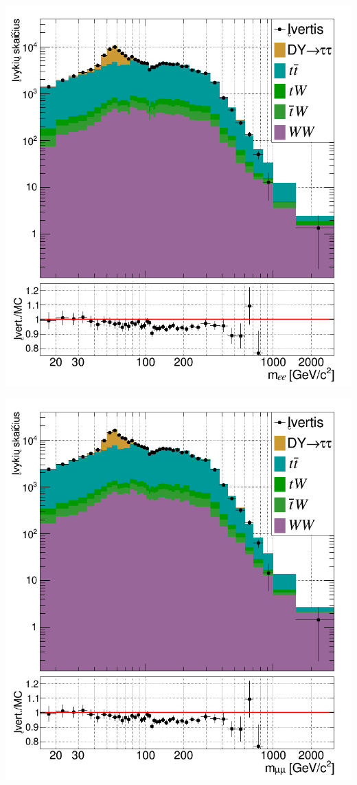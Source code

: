 \documentclass[a4paper, 12pt]{article}
\begin{document}
\vspace{0.5cm}
\noindent\begin{minipage}[t]{0.48\textwidth}
	\includegraphics[width=\linewidth]{ee_bkg_est.png}
\end{minipage}
\hfill
\begin{minipage}[t]{0.48\textwidth}
	\includegraphics[width=\linewidth]{mumu_bkg_est.png}
\end{minipage}
\end{document}
